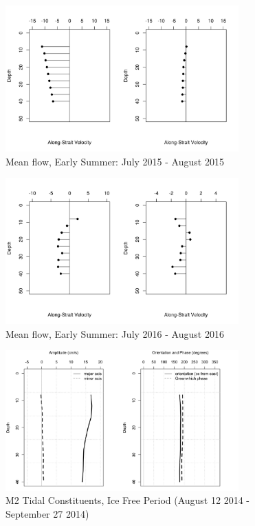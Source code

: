 \documentclass[12pt]{dforeport}
\begin{document}
\begin{figure}  
\centering
\includegraphics[width = 0.8\textwidth]{./figures/46_smf_earlySummer_2015.png}
\caption[Mean flow, Early Summer, 2015]{Mean flow, Early Summer: July 2015 - August 2015}
\label{f:smf_es_2015}
\end{figure}

\begin{figure}  
\centering
\includegraphics[width = 0.8\textwidth]{./figures/47_smf_earlySummer_2016.png}
\caption[Mean flow, Early Summer, 2016]{Mean flow, Early Summer: July 2016 - August 2016}
\label{f:smf_es_2016}
\end{figure}



\begin{figure}  
\centering
\includegraphics[width = 0.8\textwidth]{./figures/48_M2TC_if_2014.png}
  \caption[M2 Tidal Constituents, Ice free, 2014]{M2 Tidal Constituents, Ice Free Period (August 12 2014 - September 27 2014)}
\label{f:m2_if_2014}
\end{figure}
\end{document}
